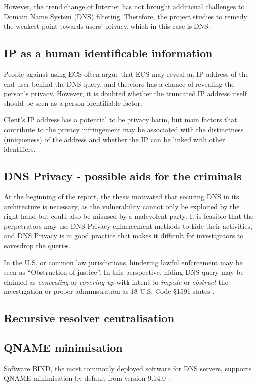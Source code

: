 However, the trend change of Internet has not brought additional challenges to Domain Name System (DNS) filtering. Therefore, the project studies to remedy the weakest point towards users' privacy, which in this case is DNS.

\subsection{IP as a human identificable information}
People against using ECS often argue that ECS may reveal an IP address of the end-user behind the DNS query, and therefore has a chance of revealing the person's privacy.
However, it is doubted whether the truncated IP address itself should be seen as a person identifiable factor.

Clent's IP address has a potential to be privacy harm, but main factors that contribute to the privacy infringement may be associated with the distinctness (uniqueness) of the address and whether the IP can be linked with other identifiers.

\subsection{DNS Privacy - possible aids for the criminals}
At the beginning of the report, the thesis motivated that securing DNS in its architecture is necessary, as the vulnerability cannot only be exploited by the right hand but could also be misused by a malevolent party.
It is feasible that the perpetrators may use DNS Privacy enhancement methods to hide their activities, and DNS Privacy is in good practice that makes it difficult for investigators to eavesdrop the queries.

In the U.S. or common law jurisdictions, hindering lawful enforcement may be seen as ``Obstruction of justice''.
In this perspective, hiding DNS query may be claimed as \textit{concealing} or \textit{covering up} with intent to \textit{impede} or \textit{obstruct} the investigation or proper administration as 18 U.S. Code \S 1591 states \cite{Obstructionofjustice}.

\subsection{Recursive resolver centralisation}

\subsection{QNAME minimisation}
Software BIND, the most commonly deployed software for DNS servers, supports QNAME minimisation by default from version 9.14.0 \cite{bind9qname}.